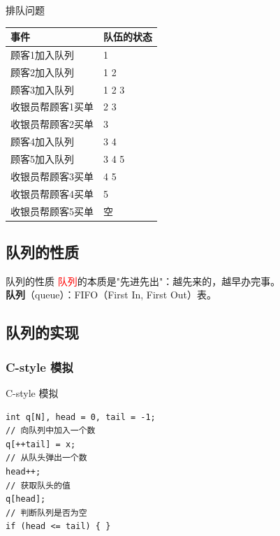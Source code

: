 \documentclass{beamer}
\begin{document}
\begin{frame}{排队问题}
    \begin{center}
    \begin{tabular}{ll}
        \toprule
        事件 & 队伍的状态 \\
        \hline
        顾客1加入队列 & 1 \\
        顾客2加入队列 & 1 2 \\
        顾客3加入队列 & 1 2 3 \\
        收银员帮顾客1买单 & 2 3 \\
        收银员帮顾客2买单 & 3 \\
        顾客4加入队列 & 3 4 \\
        顾客5加入队列 & 3 4 5 \\
        收银员帮顾客3买单 & 4 5 \\
        收银员帮顾客4买单 & 5 \\
        收银员帮顾客5买单 & 空 \\
        \bottomrule
    \end{tabular}
    \end{center}
\end{frame}

\subsection{队列的性质}
\begin{frame}{队列的性质}
    \textcolor{red}{队列}的本质是"先进先出"：越先来的，越早办完事。\\

    \textbf{队列}（queue）：FIFO（First In, First Out）表。
\end{frame}

\subsection{队列的实现}
\subsubsection{C-style 模拟}
\begin{frame}[fragile]{C-style 模拟}
    \begin{verbatim}
int q[N], head = 0, tail = -1;
// 向队列中加入一个数
q[++tail] = x;
// 从队头弹出一个数
head++;
// 获取队头的值
q[head];
// 判断队列是否为空
if (head <= tail) { }
    \end{verbatim}
\end{frame}
\end{document}
